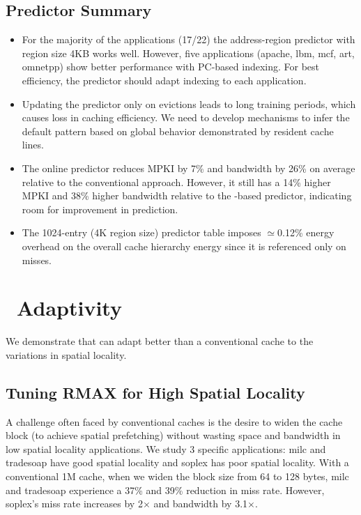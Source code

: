{{\clearpage

\subsection{Predictor Summary}
\begin{itemize}
  \item For the majority of the applications (17/22) the address-region predictor with region size 4KB works well. However, five applications (apache, lbm, mcf, art, omnetpp) show better performance with PC-based indexing. For best efficiency, the predictor should adapt indexing to each application. 
  \item Updating the predictor only on evictions leads to long training periods, which causes loss in caching efficiency. We need to develop mechanisms to infer the default pattern based on global behavior demonstrated by resident cache lines.
  \item The online predictor reduces MPKI by 7\% and bandwidth by 26\% on average relative to the conventional approach. However, it still has a 14\% higher MPKI and 38\% higher bandwidth relative to the -based predictor, indicating room for improvement in prediction. 
  \item The 1024-entry (4K region size) predictor table imposes $\simeq$0.12\% energy overhead on the overall cache hierarchy energy since it is referenced only on misses.
\end{itemize}

\section{\AC\ Adaptivity}
\label{sec:adaptivity}

We demonstrate that \AC{} can adapt better than a conventional cache to the variations in spatial locality.

\subsection{Tuning RMAX for High Spatial Locality} 

A challenge often faced by conventional caches is the desire to widen the cache block (to achieve spatial prefetching) without wasting space and bandwidth in low spatial locality applications. We study 3 specific applications: milc and tradesoap have good spatial locality and soplex has poor spatial locality. With a conventional 1M cache, when we widen the block size from 64 to 128 bytes, milc and tradesoap experience a 37\% and 39\% reduction in miss rate. However, soplex's miss rate increases by 2$\times$ and bandwidth by 3.1$\times$.

}}
